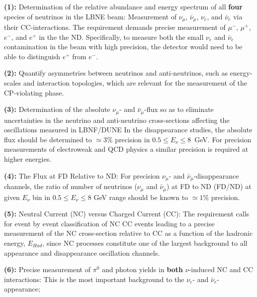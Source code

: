 \vspace{0.25cm} 
\noindent
{\bf (1):}  Determination of the relative abundance and 
energy spectrum of all  {\bf four} species of neutrinos in the LBNE beam: Measurement of 
$\nu_\mu$, $\bar \nu_\mu$, $\nu_e$, and $\bar \nu_e$ via their  CC-interactions.  
The requirement demands precise measurement of $\mu^-$, $\mu^+$, $e^-$, and $e^+$ in the 
the ND. Specifically, to measure both the small $\nu_e$ and $\bar \nu_e$ contamination in the beam with high precision, 
the detector would need to be able to distinguish $e^+$  from $e^-$. 



\vspace{0.25cm} 
\noindent
{\bf (2):} Quantify asymmetries between neutrinos and anti-neutrinos, such as 
energy-scales and interaction topologies, which are relevant for the measurement of the CP-violating phase. 


\vspace{0.25cm} 
\noindent
{\bf (3):} Determination of the absolute $\nu_\mu$- and $\bar \nu_\mu$-flux so as to  eliminate uncertainties in the neutrino and anti-neutrino cross-sections 
affecting the oscillations measured  in LBNF/DUNE In the  disappearance 
studies, the absolute flux should be determined to $\simeq 3\%$ precision in 
$0.5 \leq E_\nu \leq 8$~GeV. For precision measurements of electroweak 
and QCD physics a similar precision is required at higher energies. 

\vspace{0.25cm} 
\noindent
{\bf (4):} The  Flux at FD Relative to ND: For precision $\nu_\mu$- and $\bar \nu_\mu$-disappearance  
channels, the ratio of number of neutrinos ($\nu_\mu$  and $\bar \nu_\mu$) at FD to ND (FD/ND) 
at given $E_\nu$ bin in $0.5 \leq E_\nu \leq 8$ GeV range should be known 
to $\simeq 1\%$ precision. 

\vspace{0.25cm} 
\noindent
{\bf (5):} Neutral Current (NC) versus Charged Current (CC): 
The requirement calls for event by event classification of NC  
CC events leading to a precise measurement of 
the NC cross-section relative to 
CC as a function of the hadronic energy, $E_{Had}$, since NC processes 
constitute one of the largest background to all appearance and disappearance oscillation 
channels.

\vspace{0.25cm} 
\noindent
{\bf (6):} Precise measurement 
of $\pi^0$ and photon yields  in {\bf both}  $\nu$-induced 
NC and CC interactions: This is the most important background to the $\nu_e$- and $\bar \nu_e$-appearance; 


